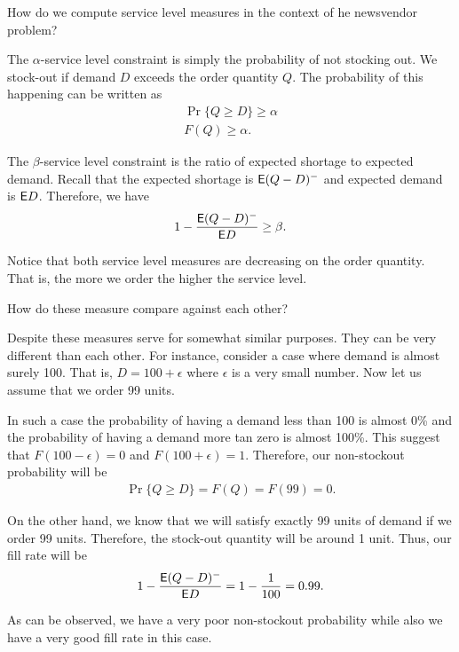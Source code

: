 \begin{question}
How do we compute service level measures in the context of he newsvendor problem?
\end{question}

\begin{solution}
The $\alpha$-service level constraint is simply the probability of not stocking out. We stock-out if demand $D$ exceeds the order quantity $Q$. The probability of this happening can be written as 
\begin{align*}
\Pr\{Q\geq D\} \geq \alpha \\
F(Q) \geq \alpha.
\end{align*}

The $\beta$-service level constraint is the ratio of expected shortage to expected demand. Recall that the expected shortage is $\mathsf{E}(Q-D)^-$ and expected demand is $\mathsf{E} D$. Therefore, we have
\begin{align*}
1-\frac{\mathsf{E}(Q-D)^-}{\mathsf{E} D} \geq \beta.
\end{align*}

Notice that both service level measures are decreasing on the order quantity. That is, the more we order the higher the service level.
\end{solution}

\begin{question}
How do these measure compare against each other?
\end{question}

\begin{solution}
Despite these measures serve for somewhat similar purposes. They can be very different than each other. For instance, consider a case where demand is almost surely 100. That is, $D=100+\epsilon$ where $\epsilon$ is a very small number. Now let us assume that we order 99 units. 

In such a case the probability of having a demand less than 100 is almost 0\% and the probability of having a demand more tan zero is almost 100\%. This suggest that $F(100-\epsilon)=0$ and $F(100+\epsilon)=1$. Therefore, our non-stockout probability will be
\begin{align*}
\Pr\{Q\geq D\} = F(Q) = F(99) = 0.
\end{align*}

On the other hand, we know that we will satisfy exactly 99 units of demand if we order 99 units. Therefore, the stock-out  quantity will be around 1 unit. Thus, our fill rate will be 
\begin{align*}
1-\frac{\mathsf{E}(Q-D)^-}{\mathsf{E} D} = 1-\frac{1}{100} = 0.99.
\end{align*}

As can be observed, we have a very poor non-stockout probability while also we have a very good fill rate in  this case. 
\end{solution}

